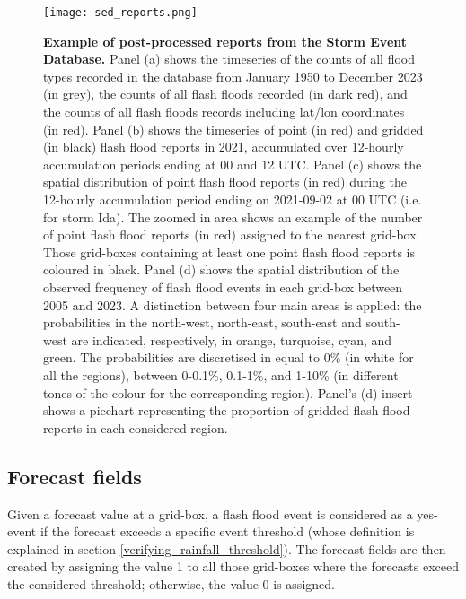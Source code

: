 \begin{figure}[htbp]
\centering
\texttt{[image: sed\_reports.png]}
\caption{\textbf{Example of post-processed reports from the Storm Event Database.} Panel (a) shows the timeseries of the counts of all flood types recorded in the database from January 1950 to December 2023 (in grey), the counts of all flash floods recorded (in dark red), and the counts of all flash floods records including lat/lon coordinates (in red). Panel (b) shows the timeseries of point (in red) and gridded (in black) flash flood reports in 2021, accumulated over 12-hourly accumulation periods ending at 00 and 12 UTC. Panel (c) shows the spatial distribution of point flash flood reports (in red) during the 12-hourly accumulation period ending on 2021-09-02 at 00 UTC (i.e. for storm Ida). The zoomed in area shows an example of the number of point flash flood reports (in red) assigned to the nearest grid-box. Those grid-boxes containing at least one point flash flood reports is coloured in black. Panel (d) shows the spatial distribution of the observed frequency of flash flood events in each grid-box between 2005 and 2023. A distinction between four main areas is applied: the probabilities in the north-west, north-east, south-east and south-west are indicated, respectively, in orange, turquoise, cyan, and green. The probabilities are discretised in equal to 0\% (in white for all the regions), between 0-0.1\%, 0.1-1\%, and 1-10\% (in different tones of the colour for the corresponding region). Panel’s (d) insert shows a piechart representing the proportion of gridded flash flood reports in each considered region.}
\label{fig:sed_reports}
\end{figure}


\subsection{Forecast fields}

Given a forecast value at a grid-box, a flash flood event is considered as a yes-event if the forecast exceeds a specific event threshold (whose definition is explained in section \ref{verifying_rainfall_threshold}). The forecast fields are then created by assigning the value 1 to all those grid-boxes where the forecasts exceed the considered threshold; otherwise, the value 0 is assigned. 


